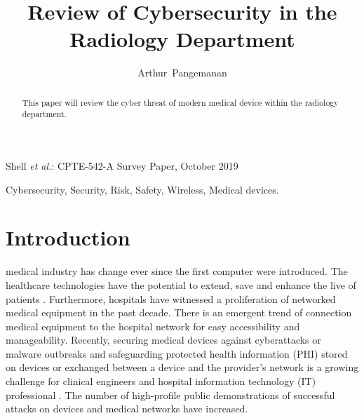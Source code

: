 \documentclass{IEEEtran}
\begin{document}
%
\title{Review of Cybersecurity in the Radiology Department}


\author{Arthur~Pangemanan}%



%
{Shell \MakeLowercase{\textit{et al.}}: CPTE-542-A Survey Paper, October 2019}

\maketitle

\begin{abstract}
	
	
	This paper will review the cyber threat of modern medical device within the radiology department.
\end{abstract}

\begin{IEEEkeywords}
Cybersecurity, Security, Risk, Safety, Wireless, Medical devices.
\end{IEEEkeywords}


\section{Introduction}
 medical industry has change ever since the first computer were introduced. The healthcare technologies have the potential to extend, save and enhance the live of patients \cite{coventry2018cybersecurity}. Furthermore, hospitals have witnessed a proliferation of networked medical equipment in the past decade. There is an emergent trend of connection medical equipment to the hospital network for easy accessibility and manageability. Recently, securing medical devices against cyberattacks or malware outbreaks and safeguarding protected health information (PHI) stored on devices or exchanged between a device and the provider's network is a growing challenge for clinical engineers and hospital information technology (IT) professional \cite{wirth2011cybercrimes}. The number of high-profile public demonstrations of successful attacks on devices and medical networks have increased. 
\end{document}
